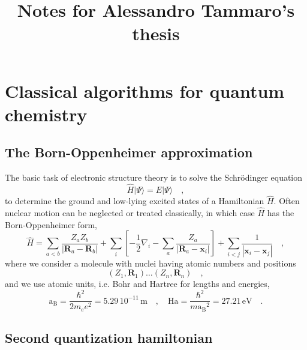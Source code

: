 \documentclass{article}
\title{Notes for Alessandro Tammaro's thesis}
\newcommand{\bohr}{\mathrm{a_B}}
\newcommand{\hartree}{\mathrm{Ha}}
\newcommand{\pos}[1]{\mathbf{#1}}
\begin{document}
\maketitle

\tableofcontents 

\pagebreak
\newpage

\section{Classical algorithms for quantum chemistry}

\subsection{The Born-Oppenheimer approximation}

The basic task of electronic structure theory is to solve the Schr\"{o}dinger equation
\begin{equation}
\hat{H} | \Psi \rangle = E | \Psi \rangle
\quad,
\end{equation}
to determine the ground and low-lying excited states
of a Hamiltonian $\hat{H}$. Often nuclear motion can
be neglected or treated classically, in which case
$\hat{H}$ has the Born-Oppenheimer form,
\begin{equation}
\hat{H} = \sum_{a<b} \frac{Z_a Z_b}{|\pos{R}_a - \pos{R}_b|} + \sum_i \left[ - \frac{1}{2} \nabla_i - \sum_{a} \frac{Z_a}{|\pos{R}_a - \pos{x}_i |}  \right]
+ \sum_{i<j} \frac{1}{|\pos{x}_i -\pos{x}_j|}
\quad,
\end{equation}
where we consider a molecule with nuclei having atomic numbers and positions
\begin{equation}
( Z_1 , \pos{R}_1 ) \dots ( Z_n , \pos{R}_n )
\quad,
\end{equation}
and we use atomic units, i.e. Bohr and Hartree for lengths and energies,
\begin{equation}
\bohr = \frac{\hbar^2}{2m_e e^2} = 5.29 \, 10^{-11} \, \mathrm{m}
\quad,\quad 
\hartree = \frac{\hbar^2}{m \bohr^2} = 27.21 \, \mathrm{eV}
\quad.
\end{equation}

\subsection{Second quantization hamiltonian}
\end{document}
